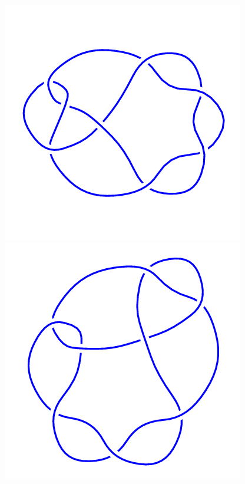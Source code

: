 \begin{figure}[H]
    \begin{minipage}[b]{.18\linewidth}
        \centering
        \includegraphics[width=\linewidth]{../data/8_7.png}
    \end{minipage}
    \begin{minipage}[b]{.18\linewidth}
        \centering
        \includegraphics[width=\linewidth]{../data/8_8.png}

\end{minipage}
\end{figure}
